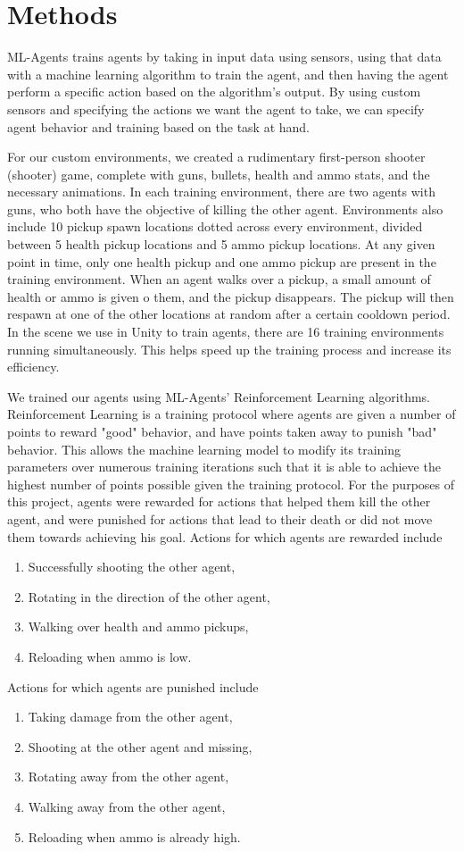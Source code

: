 \documentclass[a4paper,12pt,twocolumn]{article}
\begin{document}
\section{Methods}
ML-Agents trains agents by taking in input data using sensors, using that data with a machine learning algorithm to train the agent, and then having the agent perform a specific action based on the algorithm's output. By using custom sensors and specifying the actions we want the agent to take, we can specify agent behavior and training based on the task at hand.

For our custom environments, we created a rudimentary first-person shooter (shooter) game, complete with guns, bullets, health and ammo stats, and the necessary animations. In each training environment, there are two agents with guns, who both have the objective of killing the other agent. Environments also include 10 pickup spawn locations dotted across every environment, divided between 5 health pickup locations and 5 ammo pickup locations. At any given point in time, only one health pickup and one ammo pickup are present in the training environment. When an agent walks over a pickup, a small amount of health or ammo is given o them, and the pickup disappears. The pickup will then respawn at one of the other locations at random after a certain cooldown period. In the scene we use in Unity to train agents, there are 16 training environments running simultaneously. This helps speed up the training process and increase its efficiency.

We trained our agents using ML-Agents' Reinforcement Learning algorithms. Reinforcement Learning is a training protocol where agents are given a number of points to reward "good" behavior, and have points taken away to punish "bad" behavior. This allows the machine learning model to modify its training parameters over numerous training iterations such that it is able to achieve the highest number of points possible given the training protocol. For the purposes of this project, agents were rewarded for actions that helped them kill the other agent, and were punished for actions that lead to their death or did not move them towards achieving his goal. Actions for which agents are rewarded include
\begin{enumerate}
    \item Successfully shooting the other agent,
    \item Rotating in the direction of the other agent,
    \item Walking over health and ammo pickups,
    \item Reloading when ammo is low.
\end{enumerate}
Actions for which agents are punished include
\begin{enumerate}
    \item Taking damage from the other agent,
    \item Shooting at the other agent and missing,
    \item Rotating away from the other agent,
    \item Walking away from the other agent,
    \item Reloading when ammo is already high. 
\end{enumerate}
\end{document}
